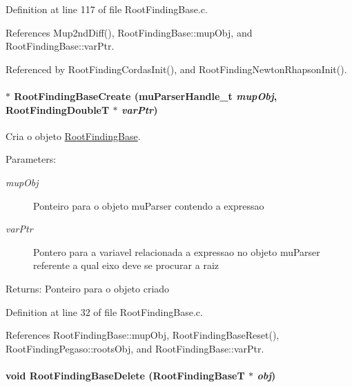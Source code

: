 Definition at line 117 of file RootFindingBase.c.

References Mup2ndDiff(), RootFindingBase::mupObj, and RootFindingBase::varPtr.

Referenced by RootFindingCordasInit(), and RootFindingNewtonRhapsonInit().\hypertarget{group____roots_gb245c32498c083793bc740a45b118280}{
\paragraph[RootFindingBaseCreate]{$\ast$ RootFindingBaseCreate (muParserHandle\_\-t {\em mupObj}, \/  {\bf RootFindingDoubleT} $\ast$ {\em varPtr})}\hfill}
\label{group____roots_gb245c32498c083793bc740a45b118280}


Cria o objeto \hyperlink{structRootFindingBase}{RootFindingBase}. 

\begin{Desc}
\item[Parameters:]
\begin{description}
\item[{\em mupObj}]Ponteiro para o objeto muParser contendo a expressao \item[{\em varPtr}]Pontero para a variavel relacionada a expressao no objeto muParser referente a qual eixo deve se procurar a raiz \end{description}
\end{Desc}
\begin{Desc}
\item[Returns:]Ponteiro para o objeto criado \end{Desc}


Definition at line 32 of file RootFindingBase.c.

References RootFindingBase::mupObj, RootFindingBaseReset(), RootFindingPegaso::rootsObj, and RootFindingBase::varPtr.\hypertarget{group____roots_gaf5d5b67be8d281fefa22e9e7cb4c24b}{
\paragraph[RootFindingBaseDelete]{\setlength{\rightskip}{0pt plus 5cm}void RootFindingBaseDelete ({\bf RootFindingBaseT} $\ast$ {\em obj})}\hfill}
\label{group____roots_gaf5d5b67be8d281fefa22e9e7cb4c24b}


